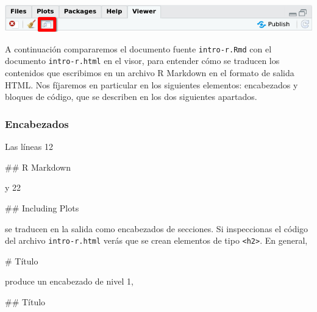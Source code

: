 \documentclass[
  degree=mecinf,
  title=normal,
  toc=normal,
  bib=normal]{mnye}
\newenvironment{Shaded}{\begin{snugshade}}{\end{snugshade}}
\newcommand{\FunctionTok}[1]{\textcolor[rgb]{0.00,0.00,0.00}{#1}}
\begin{document}
\begin{center}\includegraphics[width=1\linewidth]{images/open-in-new-window} \end{center}

A continuación compararemos el documento fuente \texttt{intro-r.Rmd} con el documento \texttt{intro-r.html} en el visor, para entender cómo se traducen los contenidos que escribimos en un archivo R Markdown en el formato de salida HTML. Nos fíjaremos en particular en los siguientes elementos: encabezados y bloques de código, que se describen en los dos siguientes apartados.

\hypertarget{encabezados}{%
\subsubsection{Encabezados}\label{encabezados}}

Las líneas 12

\begin{Shaded}
\begin{Highlighting}[]
\FunctionTok{\#\# R Markdown }
\end{Highlighting}
\end{Shaded}

y 22

\begin{Shaded}
\begin{Highlighting}[]
\FunctionTok{\#\# Including Plots}
\end{Highlighting}
\end{Shaded}

se traducen en la salida como encabezados de secciones. Si inspeccionas el código del archivo \texttt{intro-r.html} verás que se crean elementos de tipo \texttt{\textless{}h2\textgreater{}}. En general,

\begin{Shaded}
\begin{Highlighting}[]
\FunctionTok{\# Título}
\end{Highlighting}
\end{Shaded}

produce un encabezado de nivel 1,

\begin{Shaded}
\begin{Highlighting}[]
\FunctionTok{\#\# Título}
\end{Highlighting}
\end{Shaded}
\end{document}
